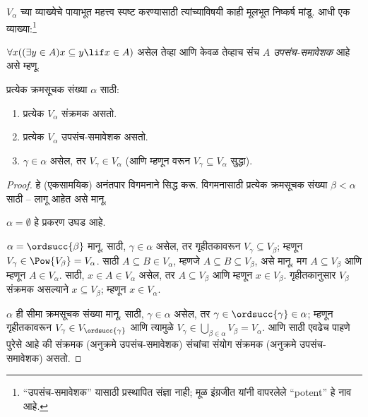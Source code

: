\documentclass[../../../include/open-logic-section]{subfiles}
\begin{document}

$V_\alpha$ च्या व्याख्येचे पायाभूत महत्त्व स्पष्ट करण्यासाठी त्यांच्याविषयी काही मूलभूत निष्कर्ष मांडू. आधी एक व्याख्या:\footnote{``उपसंच-समावेशक'' यासाठी प्रस्थापित संज्ञा नाही; मूळ इंग्रजीत \citet{ButtonLT1} यांनी वापरलेले ``potent'' हे नाव आहे.}
\begin{defn}
	$\forall x((\exists y \in A)x \subseteq y \lif x \in A)$ असेल तेव्हा आणि केवळ तेव्हाच संच $A$ \emph{उपसंच-समावेशक} आहे असे म्हणू.
\end{defn}
\begin{lem}
प्रत्येक क्रमसूचक संख्या $\alpha$ साठी:
\begin{enumerate}
	\item{} प्रत्येक $V_\alpha$ संक्रमक असतो.
	\item{} प्रत्येक $V_\alpha$ उपसंच-समावेशक असतो.
	\item{} $\gamma \in \alpha$ असेल, तर $V_\gamma
	\in V_\alpha$ (आणि म्हणून  वरून $V_\gamma \subseteq V_\alpha$ सुद्धा).
\end{enumerate}
\end{lem}

\begin{proof}
हे (एकसामयिक) अनंतपार विगमनाने सिद्ध करू. विगमनासाठी प्रत्येक क्रमसूचक संख्या $\beta < \alpha$ साठी -- लागू आहेत असे मानू.

$\alpha = \emptyset$ हे प्रकरण उघड आहे.

$\alpha = \ordsucc{\beta}$ मानू.  साठी, $\gamma \in \alpha$ असेल, तर गृहीतकावरून $V_\gamma \subseteq V_\beta$; म्हणून $V_\gamma \in \Pow{V_\beta} = V_\alpha$.  साठी $A \subseteq B \in V_\alpha$, म्हणजे $A
\subseteq B \subseteq V_\beta$, असे मानू. मग $A \subseteq V_\beta$ आणि म्हणून $A \in V_\alpha$.  साठी, $x \in A \in
V_\alpha$ असेल, तर $A \subseteq V_\beta$ आणि म्हणून $x \in V_\beta$. गृहीतकानुसार $V_\beta$ संक्रमक असल्याने $x \subseteq V_\beta$; म्हणून $x \in V_\alpha$.

$\alpha$ ही सीमा क्रमसूचक संख्या मानू.  साठी, $\gamma \in \alpha$ असेल, तर $\gamma \in \ordsucc{\gamma} \in \alpha$; म्हणून गृहीतकावरून $V_\gamma \in V_{\ordsucc{\gamma}}$ आणि त्यामुळे $V_\gamma \in \bigcup_{\beta \in \alpha} V_\beta = V_\alpha$.  आणि  साठी एवढेच पाहणे पुरेसे आहे की संक्रमक (अनुक्रमे उपसंच-समावेशक) संचांचा संयोग संक्रमक (अनुक्रमे उपसंच-समावेशक) असतो.
\end{proof}
\end{document}
